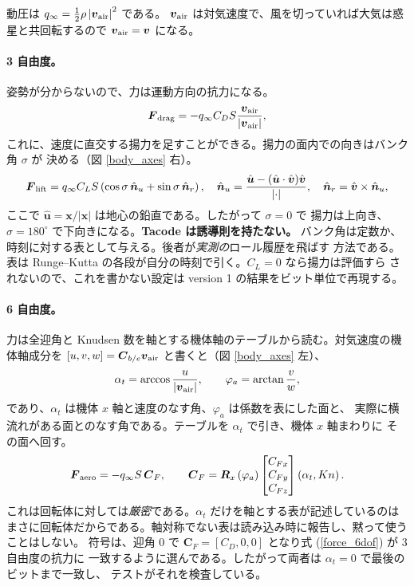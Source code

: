 \documentclass[11pt,a4paper,dvipdfmx]{jsarticle}
\newcommand{\bx}{{\boldsymbol x}}
\newcommand{\bv}{{\boldsymbol v}}
\newcommand{\bF}{{\boldsymbol F}}
\newcommand{\bC}{{\boldsymbol C}}
\newcommand{\bR}{{\boldsymbol R}}
\begin{document}
動圧は $q_{\infty} = \frac{1}{2} \rho \left| \bv_{\rm air} \right|^2$ である。
$\bv_{\rm air}$ は対気速度で、風を切っていれば大気は惑星と共回転するので
$\bv_{\rm air} = \bv$ になる。

\paragraph{3 自由度。}
姿勢が分からないので、力は運動方向の抗力になる。
%
\begin{align}
	\bF_{\rm drag} = - q_{\infty} C_D S \frac{ \bv_{\rm air} }{\left| \bv_{\rm air} \right|} ,
\end{align}
%
これに、速度に直交する揚力を足すことができる。揚力の面内での向きはバンク角 $\sigma$ が
決める（図 \ref{body_axes} 右）。
%
\begin{align}
	\bF_{\rm lift} = q_{\infty} C_L S \left( \cos\sigma \, \hat{\boldsymbol n}_u + \sin\sigma \, \hat{\boldsymbol n}_r \right) ,
	\quad
	\hat{\boldsymbol n}_u = \frac{ \hat{\boldsymbol u} - ( \hat{\boldsymbol u} \cdot \hat{\bv} ) \hat{\bv} }{ \left| \cdot \right| } ,
	\quad
	\hat{\boldsymbol n}_r = \hat{\bv} \times \hat{\boldsymbol n}_u ,
	\label{lift}
\end{align}
%
ここで $\hat{\boldsymbol u} = \bx / |\bx|$ は地心の鉛直である。したがって $\sigma = 0$ で
揚力は上向き、$\sigma = 180^\circ$ で下向きになる。\textbf{Tacode は誘導則を持たない。}
バンク角は定数か、時刻に対する表として与える。後者が\emph{実測の}ロール履歴を飛ばす
方法である。表は Runge--Kutta の各段が自分の時刻で引く。$C_L = 0$ なら揚力は評価すら
されないので、これを書かない設定は version 1 の結果をビット単位で再現する。

\paragraph{6 自由度。}
力は全迎角と Knudsen 数を軸とする機体軸のテーブルから読む。対気速度の機体軸成分を
$[u, v, w] = \bC_{b/e} \bv_{\rm air}$ と書くと（図 \ref{body_axes} 左）、
%
\begin{align}
	\alpha_t = \arccos \frac{u}{\left| \bv_{\rm air} \right|} , \qquad
	\varphi_a = \arctan \frac{v}{w} ,
\end{align}
%
であり、$\alpha_t$ は機体 $x$ 軸と速度のなす角、$\varphi_a$ は係数を表にした面と、
実際に横流れがある面とのなす角である。テーブルを $\alpha_t$ で引き、機体 $x$ 軸まわりに
その面へ回す。
%
\begin{align}
	\bF_{\rm aero} = - q_{\infty} S \, \bC_{F} ,
	\qquad
	\bC_{F} = \bR_{x} \left( \varphi_a \right)
	\begin{bmatrix} C_{Fx} \\ C_{Fy} \\ C_{Fz} \end{bmatrix} \left( \alpha_t, Kn \right) .
	\label{force_6dof}
\end{align}
%
これは回転体に対しては\emph{厳密}である。$\alpha_t$ だけを軸とする表が記述しているのは
まさに回転体だからである。軸対称でない表は読み込み時に報告し、黙って使うことはしない。
符号は、迎角 0 で $\bC_F = [C_D, 0, 0]$ となり式 (\ref{force_6dof}) が 3 自由度の抗力に
一致するように選んである。したがって両者は $\alpha_t = 0$ で最後のビットまで一致し、
テストがそれを検査している。
\end{document}
